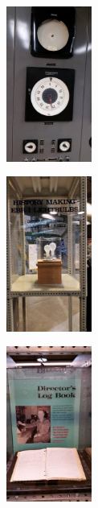 \documentclass[aspectratio=1610,pdftex,dvipsnames,compress,xcolor={dvipsnames}]{beamer}
\begin{document}
\begin{frame}{}
    \begin{figure}
        \centering
        \includegraphics[width=0.25\textwidth]{ebr7.jpg}
    \end{figure}
\end{frame}


\begin{frame}{}
    \begin{figure}
        \centering
        \includegraphics[width=0.25\textwidth]{ebr8.jpg}
    \end{figure}
\end{frame}


\begin{frame}{}
    \begin{figure}
        \centering
        \includegraphics[width=0.25\textwidth]{ebr9.jpg}
    \end{figure}
\end{frame}
\end{document}
